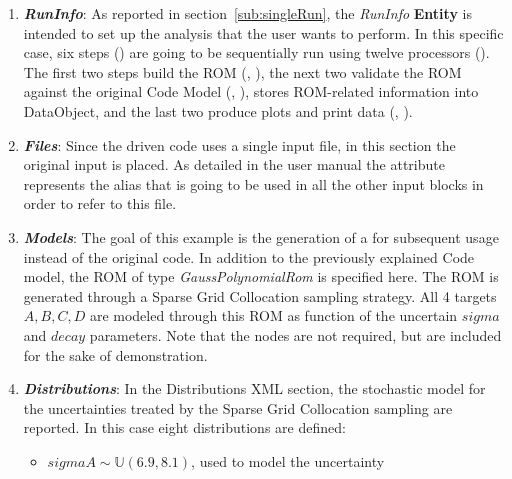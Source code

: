 \begin{enumerate}
   \item \textbf{\textit{RunInfo}}:
   As reported in section~\ref{sub:singleRun}, the \textit{RunInfo} \textbf{Entity} is intended to set up the analysis
   that the user wants to perform. In this specific case, six steps () are going to be sequentially run
   using twelve processors ().  The first two steps build the ROM
   (, ), the next two validate
   the ROM against the original Code Model (, ),
    stores ROM-related information into DataObject,
   and the last two produce plots and print data (, ).
   \item \textbf{\textit{Files}}:
   Since the driven code uses a single input file, in this section the original input is placed. As detailed in the user manual
   the attribute   represents the alias that is going to be used in all the other input blocks in order to refer to this file.
   \item \textbf{\textit{Models}}:
 The goal of this example is the generation of a 
 for subsequent usage instead of the original code.  In addition to the previously explained Code model,
 the ROM of type \textit{GaussPolynomialRom} is specified here. The ROM is generated through a Sparse Grid
 Collocation sampling strategy. All 4 targets $A,B,C,D$ are modeled through this ROM as function
 of the uncertain $sigma$ and $decay$ parameters.  Note that the  nodes are not
 required, but are included for the sake of demonstration.
   \item \textbf{\textit{Distributions}}:
  In the Distributions XML section, the stochastic model for the
  uncertainties  treated by the Sparse Grid Collocation sampling are reported. In
  this case eight distributions are defined:
  \begin{itemize}
    \item $sigmaA \sim \mathbb{U}(6.9,8.1)$, used to model the uncertainty

\end{itemize}
\end{enumerate}
